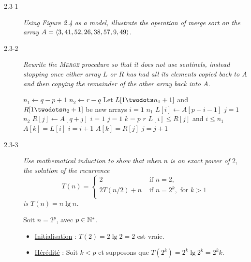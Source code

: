 \begin{description}
  \item[2.3-1] {\itshape Using Figure 2.4 as a model, illustrate the operation of merge sort on the array $A =\\ \langle 3, 41, 52, 26, 38, 57, 9, 49\rangle$}.

    \begin{exrev}
      
    \end{exrev}

  \item[2.3-2] {\itshape Rewrite the \textsc{Merge} procedure so that it does not use sentinels, instead stopping once either array $L$ or $R$ has had all its elements copied back to $A$ and then copying the remainder of the other array back into $A$.}

    \begin{ex}
      \begin{codebox}
        \li $n_1 \gets q - p + 1$
        \li $n_2 \gets r - q$
        \li Let $L[1\twodots n_1+1]$ and $R[1\twodots n_2+1]$ be new arrays
        \li \For $i = 1$ \To $n_1$ \Do
        \li $L[i] \gets A[p + i -1]$ \End
        \li \For $j = 1$ \To $n_2$ \Do
        \li $R[j] \gets A[q + j]$ \End
        \li $i = 1$
        \li $j = 1$
        \li \For $k = p$ \To $r$ \Do
        \li \If $L[i] \le R[j]$ and $i \le n_1$ \Then
        \li $A[k] = L[i]$
        \li $i = i+1$
        \li \Else 
        \li $A[k] = R[j]$
        \li $j = j+1$
      \end{codebox}
    \end{ex}

  \item[2.3-3] {\itshape Use mathematical induction to show that when $n$ is an exact power of $2$, the solution of the recurrence 
    $$T(n) = \left\{
      \begin{array}{ll}
        2 & \text{ if } n = 2,\\
        2T(n/2)+n & \text{ if }n = 2^k, \text{ for } k> 1\\
      \end{array}
    \right.$$
  is $T(n) = n\lg n$.}

    \begin{ex}
      Soit $n = 2^p$, avec $p \in \mathbb{N}^*$.
      \begin{itemize}
        \item \ul{Initialisation} : $T(2) = 2\lg 2 = 2$ est vraie.
        \item \ul{H\'er\'edit\'e} : Soit $k < p$ et supposons que $T(2^k) = 2^k\lg 2^k = 2^kk$.


\end{itemize}
\end{ex}
\end{description}

